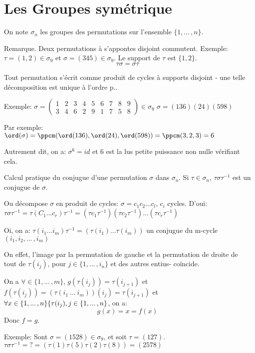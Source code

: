 \section{Les Groupes symétrique} %

On note $\sigma_n$ les groupes des permutations sur l'ensemble $\{1, ...\,, n\}$.

Remarque. Deux permutations à s'appontes disjoint commutent.
Exemple: $\tau=(1, 2)\in \sigma_9$ et $\sigma=(345) \in \sigma_9$.
Le support de $\tau$ est $\{1,2\}$. 
$$\tau\sigma =\sigma \tau$$

\begin{theorem}
	Tout permutation s'écrit comme produit de cycles à supports disjoint - une telle décomposition est unique à l'ordre p..
\end{theorem}

Exemple: $\sigma = \left(\begin{array}{ccccccccc}1&2&3&4&5&6&7&8&9\\3&4&6&2&9&1&7&5&8\end{array}\right)\in\sigma_9$
$\sigma=(136)(24)(598)$

Par exemple: $\ord(\sigma)=\ppcm(\ord(136), \ord(24), \ord(598))=\ppcm(3,2,3)=6$

Autrement dit, on a: $\sigma^6=id$ et 6 est la lus petite puissance non nulle vérifiant cela.

Calcul pratique du conjugue d'une permutation $\sigma$ dans $\sigma_n$. Si $\tau\in\sigma_n$, $\tau\sigma\tau^{-1}$ est un conjugue de $\sigma$.

Ou décompose $\sigma$ en produit de cycles: $\sigma=c_1 c_2...c_l$, $c_i$ cycles.
D'oui: $\tau\sigma\tau^{-1} =\tau(C_1...c_r)\tau^{-1}=(\tau c_1\tau^{-1})(\tau c_2\tau^{-1})...(\tau c_r\tau^{-1})$

Oi, on a: $\tau(i_1...i_m)\tau^{-1}=(\tau(i_1)...\tau(i_m))$ un conjugue du m-cycle $(i_1, i_2, ...\,, i_m)$

On effet, l'image par la permutation de gauche et la permutation de droite de tout de $\tau(i_j)$, pour $j\in\{1,...\,,i_n\}$ et des autres entius- coïncide.

On a $\forall\in\{1,...\,,m\}$, $g(\tau(i_j))=\tau(i_{j+1})$ et $f(\tau(i_j))=(\tau(i_1\ ...\ i_m))(i_j)=\tau(i_{j+1})$
et $\forall x\in \{ 1,...\,,n\}\\ \{\tau(i_j), j\in\{1,...\,,n\}$, on a:
$$g(x)=x=f(x)$$
Donc $f=g$.

Exemple:
Sont $\sigma=(1528)\in\sigma_9$, et soit $\tau=(127)$.
$\tau\sigma\tau^{-1}=?= (\tau(1)\tau(5)\tau(2)\tau(8))=(2578)$

